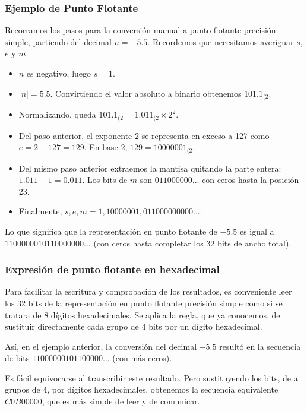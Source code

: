 \documentclass[spanish,A4,]{article}
\begin{document}
\subsubsection{Ejemplo de Punto
Flotante}\label{ejemplo-de-punto-flotante}

Recorramos los pasos para la conversión manual a punto flotante
precisión simple, partiendo del decimal $n = -5.5$. Recordemos que
necesitamos averiguar $s$, $e$ y $m$.

\begin{itemize}
\itemsep1pt\parskip0pt
\item
  $n$ es negativo, luego $s = 1$.
\item
  $|n| = 5.5$. Convirtiendo el valor absoluto a binario obtenemos
  $101.1_{(2}$.
\item
  Normalizando, queda $101.1_{(2} = 1.011_{(2}\times 2^2$.
\item
  Del paso anterior, el exponente 2 se representa en exceso a 127 como
  $e = 2 + 127 = 129$. En base 2, $129 = 10000001_{(2}$.
\item
  Del mismo paso anterior extraemos la mantisa quitando la parte entera:
  $1.011 - 1 = 0.011$. Los bits de $m$ son $011000000...$ con ceros
  hasta la posición 23.
\item
  Finalmente, $s, e, m = 1, 10000001, 011000000000...$.
\end{itemize}

Lo que significa que la representación en punto flotante de $-5.5$ es
igual a $1100000010110000000...$ (con ceros hasta completar los 32 bits
de ancho total).

\subsubsection{Expresión de punto flotante en
hexadecimal}\label{expresiuxf3n-de-punto-flotante-en-hexadecimal}

Para facilitar la escritura y comprobación de los resultados, es
conveniente leer los 32 bits de la representación en punto flotante
precisión simple como si se tratara de 8 dígitos hexadecimales. Se
aplica la regla, que ya conocemos, de sustituir directamente cada grupo
de 4 bits por un dígito hexadecimal.

Así, en el ejemplo anterior, la conversión del decimal $-5.5$ resultó en
la secuencia de bits $11000000101100000...$ (con más ceros).

Es fácil equivocarse al transcribir este resultado. Pero sustituyendo
los bits, de a grupos de 4, por dígitos hexadecimales, obtenemos la
secuencia equivalente $C0B00000$, que es más simple de leer y de
comunicar.
\end{document}
